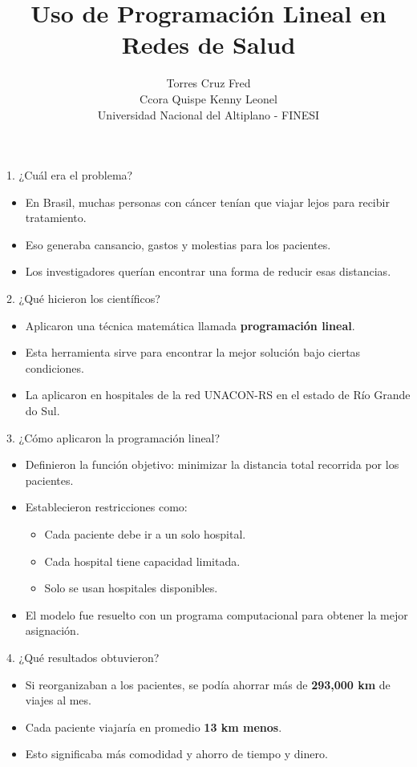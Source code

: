\documentclass{beamer}
\title{Uso de Programación Lineal en Redes de Salud}
\author{ Torres Cruz Fred \\ Ccora Quispe Kenny Leonel \\ Universidad Nacional del Altiplano - FINESI}
\begin{document}
\begin{frame}
  \titlepage
\end{frame}

\begin{frame}{1. ¿Cuál era el problema?}
\begin{itemize}
  \item En Brasil, muchas personas con cáncer tenían que viajar lejos para recibir tratamiento.
  \item Eso generaba cansancio, gastos y molestias para los pacientes.
  \item Los investigadores querían encontrar una forma de reducir esas distancias.
\end{itemize}
\end{frame}

\begin{frame}{2. ¿Qué hicieron los científicos?}
\begin{itemize}
  \item Aplicaron una técnica matemática llamada \textbf{programación lineal}.
  \item Esta herramienta sirve para encontrar la mejor solución bajo ciertas condiciones.
  \item La aplicaron en hospitales de la red UNACON-RS en el estado de Río Grande do Sul.
\end{itemize}
\end{frame}

\begin{frame}{3. ¿Cómo aplicaron la programación lineal?}
\begin{itemize}
  \item Definieron la función objetivo: minimizar la distancia total recorrida por los pacientes.
  \item Establecieron restricciones como:
  \begin{itemize}
    \item Cada paciente debe ir a un solo hospital.
    \item Cada hospital tiene capacidad limitada.
    \item Solo se usan hospitales disponibles.
  \end{itemize}
  \item El modelo fue resuelto con un programa computacional para obtener la mejor asignación.
\end{itemize}
\end{frame}

\begin{frame}{4. ¿Qué resultados obtuvieron?}
\begin{itemize}
  \item Si reorganizaban a los pacientes, se podía ahorrar más de \textbf{293,000 km} de viajes al mes.
  \item Cada paciente viajaría en promedio \textbf{13 km menos}.
  \item Esto significaba más comodidad y ahorro de tiempo y dinero.
\end{itemize}
\end{frame}
\end{document}
